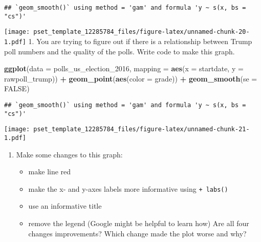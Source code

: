 \documentclass[
]{article}
\newenvironment{Shaded}{\begin{snugshade}}{\end{snugshade}}
\newcommand{\DataTypeTok}[1]{\textcolor[rgb]{0.13,0.29,0.53}{#1}}
\newcommand{\DecValTok}[1]{\textcolor[rgb]{0.00,0.00,0.81}{#1}}
\newcommand{\KeywordTok}[1]{\textcolor[rgb]{0.13,0.29,0.53}{\textbf{#1}}}
\newcommand{\NormalTok}[1]{#1}
\newcommand{\OperatorTok}[1]{\textcolor[rgb]{0.81,0.36,0.00}{\textbf{#1}}}
\newcommand{\OtherTok}[1]{\textcolor[rgb]{0.56,0.35,0.01}{#1}}
\newcommand{\StringTok}[1]{\textcolor[rgb]{0.31,0.60,0.02}{#1}}
\providecommand{\tightlist}{%
  \setlength{\itemsep}{0pt}\setlength{\parskip}{0pt}}
\begin{document}
\begin{verbatim}
## `geom_smooth()` using method = 'gam' and formula 'y ~ s(x, bs = "cs")'
\end{verbatim}

\texttt{[image: pset\_template\_12285784\_files/figure-latex/unnamed-chunk-20-1.pdf]}
1. You are trying to figure out if there is a relationship between Trump
poll numbers and the quality of the polls. Write code to make this
graph.

\begin{Shaded}
\begin{Highlighting}[]
    \KeywordTok{ggplot}\NormalTok{(}\DataTypeTok{data =}\NormalTok{ polls_us_election_}\DecValTok{2016}\NormalTok{, }
           \DataTypeTok{mapping =} \KeywordTok{aes}\NormalTok{(}\DataTypeTok{x =}\NormalTok{ startdate, }
                         \DataTypeTok{y =}\NormalTok{ rawpoll_trump)) }\OperatorTok{+}
\StringTok{        }\KeywordTok{geom_point}\NormalTok{(}\KeywordTok{aes}\NormalTok{(}\DataTypeTok{color =}\NormalTok{ grade)) }\OperatorTok{+}
\StringTok{        }\KeywordTok{geom_smooth}\NormalTok{(}\DataTypeTok{se =} \OtherTok{FALSE}\NormalTok{)}
\end{Highlighting}
\end{Shaded}

\begin{verbatim}
## `geom_smooth()` using method = 'gam' and formula 'y ~ s(x, bs = "cs")'
\end{verbatim}

\texttt{[image: pset\_template\_12285784\_files/figure-latex/unnamed-chunk-21-1.pdf]}

\begin{enumerate}
\def\labelenumi{\arabic{enumi}.}
\tightlist
\item
  Make some changes to this graph:

  \begin{itemize}
  \tightlist
  \item
    make line red
  \item
    make the x- and y-axes labels more informative using
    \texttt{+\ labs()}
  \item
    use an informative title
  \item
    remove the legend (Google might be helpful to learn how) Are all
    four changes improvements? Which change made the plot worse and why?
  \end{itemize}
\end{enumerate}
\end{document}
